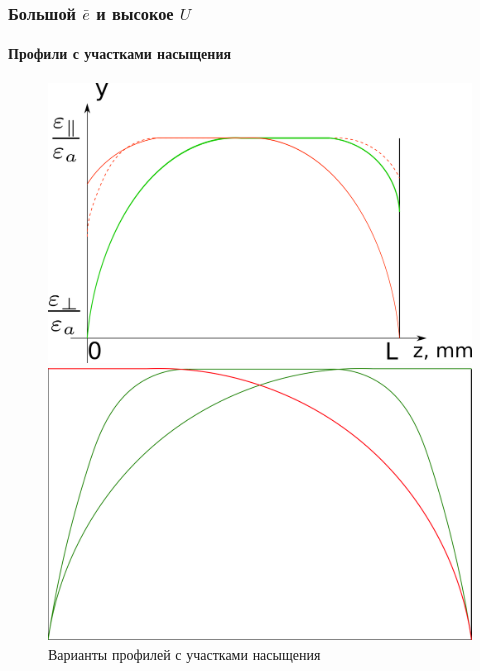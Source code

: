\documentclass[utf8,secheader]{beamer}
\begin{document}
\begin{frame}
\frametitle{Большой $\bar{e}$ и высокое $U$}
\framesubtitle{Профили с участками насыщения}
\vspace{-0.25cm}
\begin{figure}[ht]
\centering
\begin{minipage}{0.49\textwidth}
\includegraphics[width=\textwidth]{Profiles_saturated_1.png}
\end{minipage}
\hfill
\begin{minipage}{0.49\textwidth}
\includegraphics[width=\textwidth]{Profiles_saturated_2.png}
\end{minipage}
\caption{Варианты профилей с участками насыщения}
\end{figure}
\end{frame}
\end{document}
